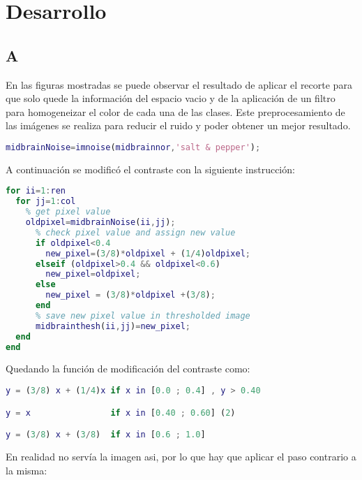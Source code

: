 \documentclass[10pt,journal,compsoc]{IEEEtran}\usepackage[T1]{fontenc}                              %
\begin{document}
 
\hfill

\section{Desarrollo}

\subsection{A}

En las figuras mostradas se puede observar el resultado de aplicar el recorte para que solo quede la información del espacio vacio y de la aplicación  de un filtro para homogeneizar el color de cada una de las clases.
Este preprocesamiento de las imágenes se realiza para reducir el ruido y poder obtener un mejor resultado.

\begin{lstlisting}[language=Matlab,basicstyle=\small]
midbrainNoise=imnoise(midbrainnor,'salt & pepper');
\end{lstlisting}

A continuación se modificó el contraste con la siguiente instrucción:

\begin{lstlisting}[language=Matlab,basicstyle=\small]
for ii=1:ren
  for jj=1:col
    % get pixel value
    oldpixel=midbrainNoise(ii,jj);
      % check pixel value and assign new value
      if oldpixel<0.4
        new_pixel=(3/8)*oldpixel + (1/4)oldpixel;
      elseif (oldpixel>0.4 && oldpixel<0.6)
        new_pixel=oldpixel;
      else
        new_pixel = (3/8)*oldpixel +(3/8);
      end
      % save new pixel value in thresholded image
      midbrainthesh(ii,jj)=new_pixel;
  end
end
\end{lstlisting}

Quedando la función de modificación del contraste como:

\begin{lstlisting}[language=Matlab,basicstyle=\small]
y = (3/8) x + (1/4)x if x in [0.0 ; 0.4] , y > 0.40

y = x                if x in [0.40 ; 0.60] (2)

y = (3/8) x + (3/8)  if x in [0.6 ; 1.0]
\end{lstlisting}

En realidad no servía la imagen asi, por lo que hay que aplicar el paso contrario a la misma:
\end{document}

